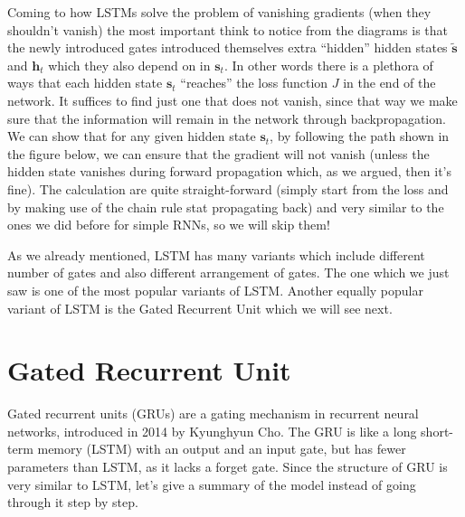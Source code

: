 Coming to how LSTMs solve the problem of vanishing gradients (when they shouldn't vanish) the most important think to
notice from the diagrams is that the newly introduced gates introduced themselves extra ``hidden'' hidden states
$\boldsymbol{\tilde{s}}$ and $\boldsymbol{h}_{t}$ which they also depend on in $\boldsymbol{s}_{t}$. In other words
there is a plethora of ways that each hidden state $\boldsymbol{s}_{t}$ ``reaches'' the loss function $J$ in the end of the
network. It suffices to find just one that does not vanish, since that way we make sure that the information will
remain in the network through backpropagation. We can show that for any given hidden state $\boldsymbol{s}_{t}$, by
following the path shown in the figure below, we can ensure that the gradient will not vanish (unless the hidden state
vanishes during forward propagation which, as we argued, then it's fine). The calculation are quite straight-forward
(simply start from the loss and by making use of the chain rule stat propagating back) and very similar to the ones
we did before for simple RNNs, so we will skip them!


As we already mentioned, LSTM has many variants which include different number of gates and also different arrangement
of gates. The one which we just saw is one of the most popular variants of LSTM. Another equally popular variant of
LSTM is the Gated Recurrent Unit which we will see next.

\section{Gated Recurrent Unit}

Gated recurrent units (GRUs) are a gating mechanism in recurrent neural networks, introduced in 2014 by Kyunghyun Cho.
The GRU is like a long short-term memory (LSTM) with an output and an input gate, but has fewer parameters than
LSTM, as it lacks a forget gate. Since the structure of GRU is very similar to LSTM, let's give a summary of the
model instead of going through it step by step.


